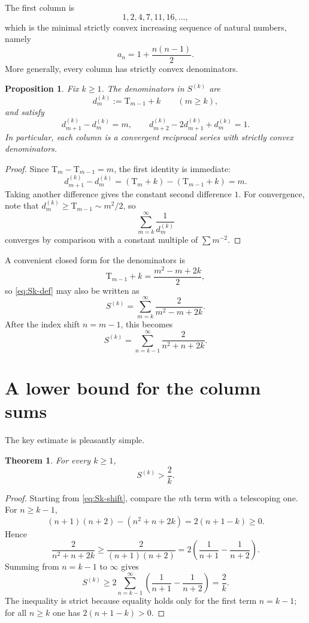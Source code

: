 \documentclass[11pt]{article}
\newtheorem{theorem}{Theorem}
\newtheorem{proposition}{Proposition}
\newcommand{\T}{\mathrm{T}}
\begin{document}
The first column is
\[
1,2,4,7,11,16,\dots,
\]
which is the minimal strictly convex increasing sequence of natural numbers, namely
\[
a_n = 1 + \frac{n(n-1)}{2}.
\]
More generally, every column has strictly convex denominators.

\begin{proposition}\label{prop:convex}
Fix $k \ge 1$. The denominators in $S^{(k)}$ are
\[
d_m^{(k)} := \T_{m-1}+k \qquad (m \ge k),
\]
and satisfy
\[
d_{m+1}^{(k)} - d_m^{(k)} = m, \qquad d_{m+2}^{(k)} - 2d_{m+1}^{(k)} + d_m^{(k)} = 1.
\]
In particular, each column is a convergent reciprocal series with strictly convex denominators.
\end{proposition}

\begin{proof}
Since $\T_m-\T_{m-1}=m$, the first identity is immediate:
\[
d_{m+1}^{(k)} - d_m^{(k)} = (\T_m+k)-(\T_{m-1}+k)=m.
\]
Taking another difference gives the constant second difference $1$. For convergence, note that $d_m^{(k)} \ge \T_{m-1} \sim m^2/2$, so
\[
\sum_{m=k}^{\infty} \frac{1}{d_m^{(k)}}
\]
converges by comparison with a constant multiple of $\sum m^{-2}$.
\end{proof}

A convenient closed form for the denominators is
\[
\T_{m-1}+k = \frac{m^2-m+2k}{2},
\]
so \eqref{eq:Sk-def} may also be written as
\begin{equation}\label{eq:Sk-rational}
S^{(k)} = \sum_{m=k}^{\infty} \frac{2}{m^2-m+2k}.
\end{equation}
After the index shift $n=m-1$, this becomes
\begin{equation}\label{eq:Sk-shift}
S^{(k)} = \sum_{n=k-1}^{\infty} \frac{2}{n^2+n+2k}.
\end{equation}

\section{A lower bound for the column sums}

The key estimate is pleasantly simple.

\begin{theorem}\label{thm:lowerbound}
For every $k \ge 1$,
\[
S^{(k)} > \frac{2}{k}.
\]
\end{theorem}

\begin{proof}
Starting from \eqref{eq:Sk-shift}, compare the $n$th term with a telescoping one. For $n \ge k-1$,
\[
(n+1)(n+2) - (n^2+n+2k) = 2(n+1-k) \ge 0.
\]
Hence
\[
\frac{2}{n^2+n+2k} \ge \frac{2}{(n+1)(n+2)} = 2\left(\frac{1}{n+1}-\frac{1}{n+2}\right).
\]
Summing from $n=k-1$ to $\infty$ gives
\[
S^{(k)} \ge 2\sum_{n=k-1}^{\infty} \left(\frac{1}{n+1}-\frac{1}{n+2}\right)=\frac{2}{k}.
\]
The inequality is strict because equality holds only for the first term $n=k-1$; for all $n \ge k$ one has $2(n+1-k)>0$.
\end{proof}
\end{document}
